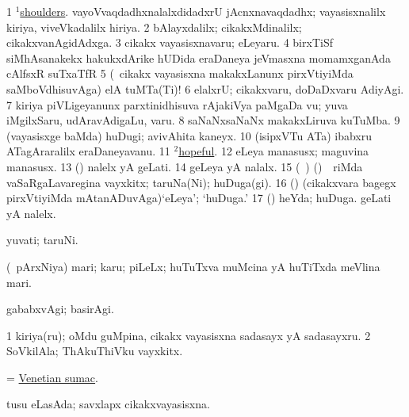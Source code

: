 \noindent
\gl{\pagu} 
\bmng
\bnum
\num{1}  \hyperref{kandict_s.pdf}{S}{shoulder(1) pagu(5)}{$^1$shoulders}. vayoVvaqdadhxnalalxdidadxrU jAcnxnavaqdadhx; vayasisxnalilx kiriya, viveVkadalilx hiriya.  
\num{2}  bAlayxdalilx; cikakxMdinalilx; cikakxvanAgidAdxga. 
\num{3}  cikakx vayasisxnavaru; eLeyaru. 
\num{4}   birxTiSf siMhAsanakekx hakukxdArike hUDida eraDaneya jeVmasxna momamxganAda cAlfsxR suTxaTfR  
\num{5}  (\sA\ cikakx vayasisxna makakxLanunx pirxVtiyiMda saMboVdhisuvAga) elA tuMTa(Ti)!  
\num{6}  elalxrU; cikakxvaru, doDaDxvaru AdiyAgi. 
\num{7}  kiriya piVLigeyanunx parxtinidhisuva rAjakiVya paMgaDa \mo vu; yuva iMgilxSaru, udAravAdigaLu, \mo varu. 
\num{8}  saNaNxsaNaNx makakxLiruva kuTuMba. 
\num{9}  (vayasisxge baMda) huDugi; avivAhita kaneyx. 
\num{10}  (isipxVTu ATa) ibabxru ATagAraralilx eraDaneyavanu. 
\num{11}  \hyperref{kandict_h.pdf}{H}{hopeful(2) pagu}{$^2$hopeful}. 
\num{12}  eLeya manasusx; maguvina manasusx. 
\num{13}   (\AmA) nalelx  yA geLati. 
\num{14}  geLeya yA nalalx. 
\num{15}  (\kanmu\ \UK) (\nAyxshA) \sA\ \,riMda \,vaSaRgaLavaregina vayxkitx; taruNa(Ni); huDuga(gi). 
\num{16}  (\pArxparx) (cikakxvara bagegx pirxVtiyiMda mAtanADuvAga)`eLeya'; `huDuga.' 
\num{17}  (\AmA) heYda; huDuga. 
   
\banum
{} geLati yA nalelx. 

  yuvati; taruNi.
\eanum
\numie
\enum
\emng
\eentry

\bentry
{} 
\gl{\nA} 
\bmng
(\sA\ pArxNiya) mari; karu; piLeLx; huTuTxva muMcina yA huTiTxda meVlina mari.
\emng

\noindent
\gl{\pagu} 
\bmng
{} gababxvAgi; basirAgi.
\emng
\eentry

\bentry
{}
\gl{\nA} 
\bmng
\bnum
\num{1} kiriya(ru); oMdu guMpina, cikakx vayasisxna sadasayx yA sadasayxru. 
\num{2} SoVkilAla; ThAkuThiVku vayxkitx.
\enum
\emng
\eentry

\bentry
{}  
\gl{\nA} 
\bmng
= \hyperref{kandict_v.pdf}{V}{Venetian sumac}{Venetian sumac}.
\emng
\eentry

\bentry
{} 
\gl{\gu} 
\bmng
tusu eLasAda; savxlapx cikakxvayasisxna.
\emng
\eentry

